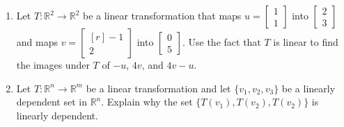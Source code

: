 \documentclass[12pt]{article}
\newcommand{\reals}{\mathbb{R}}
\begin{document}
\begin{multicols*}{2}
\begin{enumerate}
		\item Let $T:\reals^2\to \reals^2$ be a linear transformation that maps $u = \begin{bmatrix}
			1\\1
		\end{bmatrix}$ into $\begin{bmatrix}
			2\\3
		\end{bmatrix}$ and maps $v = \begin{bmatrix*}[r]
			-1\\2
		\end{bmatrix*}$ into $\begin{bmatrix}
			0\\5
		\end{bmatrix}$. Use the fact that $T$ is linear to find the images under $T$ of $-u$, $4v$, and $4v-u$.
		\vfill

		\item Let $T:\reals^n\to \reals^m$ be a linear transformation and let $\{v_1, v_2, v_3\}$ be a linearly dependent set in $\reals^n$. Explain why the set $\{T(v_1), T(v_2), T(v_2)\}$ is linearly dependent.
		\vfill
	\end{enumerate}	
\end{multicols*}
\end{document}
